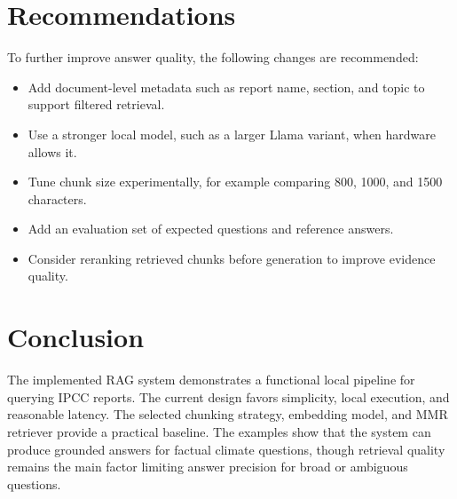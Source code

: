 \documentclass[11pt,a4paper]{article}
\begin{document}
\section{Recommendations}

To further improve answer quality, the following changes are recommended:

\begin{itemize}
    \item Add document-level metadata such as report name, section, and topic to support filtered retrieval.
    \item Use a stronger local model, such as a larger Llama variant, when hardware allows it.
    \item Tune chunk size experimentally, for example comparing 800, 1000, and 1500 characters.
    \item Add an evaluation set of expected questions and reference answers.
    \item Consider reranking retrieved chunks before generation to improve evidence quality.
\end{itemize}

\section{Conclusion}

The implemented RAG system demonstrates a functional local pipeline for querying IPCC reports. The current design favors simplicity, local execution, and reasonable latency. The selected chunking strategy, embedding model, and MMR retriever provide a practical baseline. The examples show that the system can produce grounded answers for factual climate questions, though retrieval quality remains the main factor limiting answer precision for broad or ambiguous questions.
\end{document}
